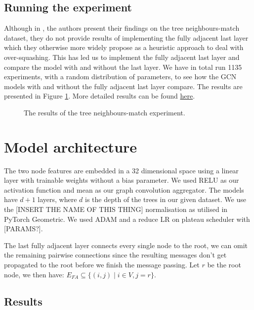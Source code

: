 \documentclass[a4paper,12pt]{article}
\begin{document}
\subsection{Running the experiment} %

Although in \cite{alon_bottleneck_2021}, the authors present their findings on the tree neighbours-match dataset, they do not provide results of implementing the fully adjacent last layer which they otherwise more widely propose as a heuristic approach to deal with over-squashing.
This has led us to implement the fully adjacent last layer and compare the model with and without the last layer. We have in total run 1135 experiments, with a random distribution of parameters, to see how the GCN models with and without the fully adjacent last layer compare. The results are presented in Figure \ref{fig:tree_experiment_graph}. More detailed results can be found \href{PLACE SOMETHING HERE MAYBE A LINK TO THE RESULTS IN THE}{here}.

\begin{figure}[H]
	\centering
	
	\caption{The results of the tree neighbours-match experiment.}
	\label{fig:tree_experiment_graph}
\end{figure}

\section{Model architecture} %

The two node features are embedded in a 32 dimensional space using a linear layer with trainable weights without a bias parameter. We used RELU as our activation function and mean as our graph convolution aggregator. The models have $d+1$ layers, where $d$ is the depth of the trees in our given dataset.
We use the [INSERT THE NAME OF THIS THING] normalisation as utilised in PyTorch Geometric. We used ADAM and a reduce LR on plateau scheduler with [PARAMS?].

The last fully adjacent layer connects every single node to the root, we can omit the remaining pairwise connections since the resulting messages don't get propagated to the root before we finish the message passing. Let $r$ be the root node, we then have: $E_{FA} \subseteq \{(i, j) \mid i \in V, j = r\}$.

\subsection{Results} %
\end{document}
